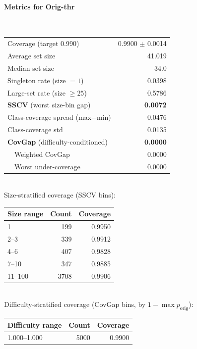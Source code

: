 \documentclass[parskip=half]{scrartcl}
\begin{document}
\paragraph{Metrics for Orig-thr}~\\
\begin{tabular}{l r}
\hline
Coverage (target 0.990) & 0.9900 $\pm$ 0.0014 \\
Average set size & 41.019 \\
Median set size & 34.0 \\
Singleton rate (size $=1$) & 0.0398 \\
Large-set rate (size $\geq 25$) & 0.5786 \\
\textbf{SSCV} (worst size-bin gap) & \textbf{0.0072} \\
Class-coverage spread (max$-$min) & 0.0476 \\
Class-coverage std & 0.0135 \\
\textbf{CovGap} (difficulty-conditioned) & \textbf{0.0000} \\
~~Weighted CovGap & 0.0000 \\
~~Worst under-coverage & 0.0000 \\
\hline
\end{tabular}\\[0.5em]
\textsf{\scriptsize Size-stratified coverage (SSCV bins):}\\
\begin{tabular}{l r r}
\hline
Size range & Count & Coverage \\
\hline
1 & 199 & 0.9950 \\
2--3 & 339 & 0.9912 \\
4--6 & 407 & 0.9828 \\
7--10 & 347 & 0.9885 \\
11--100 & 3708 & 0.9906 \\
\hline
\end{tabular}\\[0.5em]
\textsf{\scriptsize Difficulty-stratified coverage (CovGap bins, by $1-\max p_{\mathrm{orig}}$):}\\
\begin{tabular}{l r r}
\hline
Difficulty range & Count & Coverage \\
\hline
1.000--1.000 & 5000 & 0.9900 \\
\hline
\end{tabular}\\[0.5em]
\end{document}
